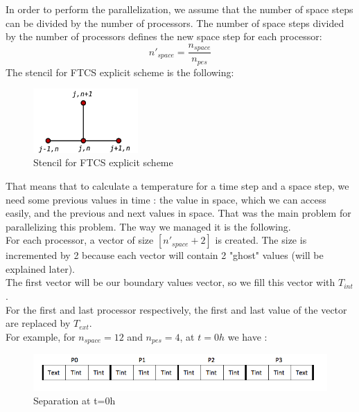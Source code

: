 \documentclass{article}
\begin{document}
            In order to perform the parallelization, we assume that the number of 
            space steps can be divided by the number of processors. The number of
            space steps divided by the number of processors defines the new space
            step for each processor:
            \begin{equation}
                n'_{space} = \frac{n_{space}}{n_{pes}}
            \end{equation}
            The stencil for FTCS explicit scheme is the following:
            \begin{figure}[H]
                \includegraphics[width=4cm]{stencil_explicit.png}
                \centering
                \caption{Stencil for FTCS explicit scheme}
            \end{figure}

            That means that to calculate a temperature for a time step and a space
            step, we need some previous values in time : the value in space, 
            which we can access easily, and the previous and next values in space.
            That was the main problem for parallelizing this problem. The way we managed
            it is the following.\\
            For each processor, a vector of size $[n'_{space} + 2]$ is created. The size is incremented
            by 2 because each vector will contain 2 "ghost" values (will be explained later).\\
            The first vector will be our boundary values vector, so we fill this vector
            with $T_{int}$.\\
            For the first and last processor respectively, the first and last value of the vector are
            replaced by $T_{ext}$.\\
            For example, for $n_{space} = 12$ and $n_{pes} = 4$, at $t=0h$ we have :
            \begin{figure}[H]
                \includegraphics[width=\textwidth]{separation.png}
                \caption{Separation at t=0h}
            \end{figure}
\end{document}
